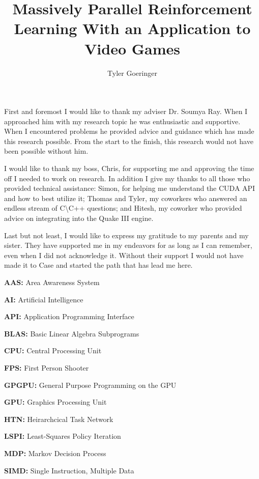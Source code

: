 \clearpage{}

\title{Massively Parallel Reinforcement Learning With an Application to Video Games}
\author{Tyler Goeringer}
\date{}
\maketitle


\committeeapprovalpage

\begin{acknowledgments}
First and foremost I would like to thank my adviser Dr. Soumya Ray. When I approached him with my research topic he was enthusiastic and supportive. When I encountered problems he provided advice and guidance which has made this research possible. From the start to the finish, this research would not have been possible without him.
    
I would like to thank my boss, Chris, for supporting me and approving the time off I needed to work on research. In addition I give my thanks to all those who provided technical assistance: Simon, for helping me understand the CUDA API and how to best utilize it; Thomas and Tyler, my coworkers who answered an endless stream of C\textbackslash C++ questions; and Hitesh, my coworker who provided advice on integrating into the Quake III engine.

Last but not least, I would like to express my gratitude to my parents and my sister. They have supported me in my endeavors for as long as I can remember, even when I did not acknowledge it. Without their support I would not have made it to Case and started the path that has lead me here.
\end{acknowledgments}

\tableofcontents
\listoftables
\listoffigures

\begin{abbreviations}
    \textbf{AAS:} Area Awareness System

    \textbf{AI:} Artificial Intelligence

    \textbf{API:} Application Programming Interface
    
    \textbf{BLAS:} Basic Linear Algebra Subprograms
    
    \textbf{CPU:} Central Processing Unit
    
    \textbf{FPS:} First Person Shooter
    
    \textbf{GPGPU:} General Purpose Programming on the GPU
    
    \textbf{GPU:} Graphics Processing Unit
    
    \textbf{HTN:} Heirarchcical Task Network
    
    \textbf{LSPI:} Least-Squares Policy Iteration
    
    \textbf{MDP:} Markov Decision Process
    
    \textbf{SIMD:} Single Instruction, Multiple Data
\end{abbreviations}

